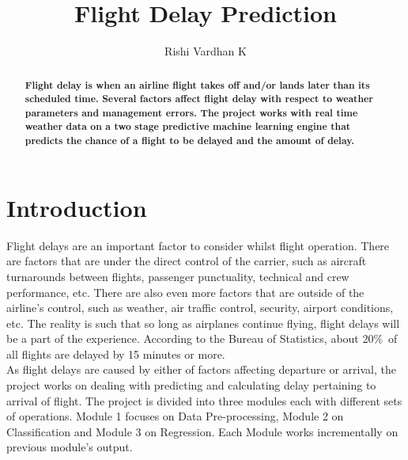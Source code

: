 \documentclass{article}
\title{Flight Delay Prediction}
\author{Rishi Vardhan K}
\begin{document}
\maketitle

\begin{abstract}
\textbf{
Flight delay is when an airline flight takes off and/or lands later than its scheduled time. Several factors affect flight delay with respect to weather parameters and management errors. The project works with real time weather data on a two stage predictive machine learning engine that predicts the chance of a flight to be delayed and the amount of delay.
}
\end{abstract}

\section{Introduction}

Flight delays are an important factor to consider whilst flight operation. There are factors that are under the direct control of the carrier, such as aircraft turnarounds between flights, passenger punctuality, technical and crew performance, etc. There are also even more factors that are outside of the airline’s control, such as weather, air traffic control, security, airport conditions, etc. The reality is such that so long as airplanes continue flying, flight delays will be a part of the experience. According to the Bureau of Statistics, about 20\%\ of all flights are delayed by 15 minutes or more. \\

As flight delays are caused by either of factors affecting departure or arrival, the project works on dealing with predicting and calculating delay pertaining to arrival of flight. The project is divided into three modules each with different sets of operations. Module 1 focuses on Data Pre-processing, Module 2 on Classification and Module 3 on Regression. Each Module works incrementally on previous module's output. 
\end{document}
